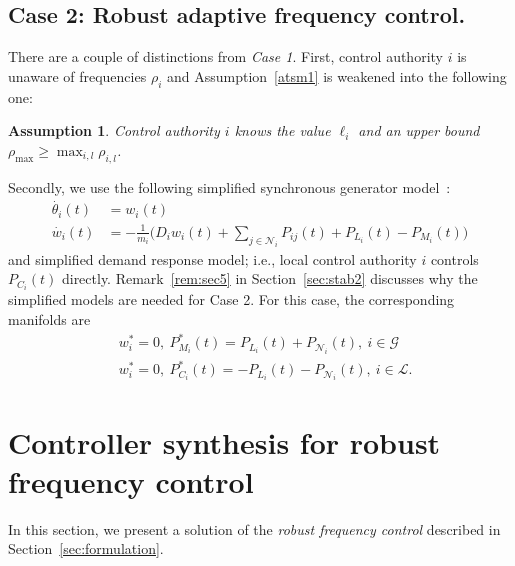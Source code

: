 \documentclass[journal]{IEEEtran}
\newcommand{\nnum}{\nonumber}
\newcommand{\GG}{{\mathcal{G}}}
\newcommand{\LL}{{\mathcal{L}}}
\newcommand{\NN}{{\mathcal{N}}}
\newtheorem{assumption}{\bf Assumption}[section]
\begin{document}
\subsection{Case 2: Robust adaptive frequency control.}\label{sec:formulation2}
There are a couple of distinctions from \emph{Case 1}.
First, control authority $i$ is unaware of frequencies $\rho_i$ and Assumption~\ref{atsm1} is weakened into the following one:
\begin{assumption}
Control authority $i$ knows the value $\ell_i$ and an upper bound $\rho_{\max} \geq \max_{i,l}\rho_{i,l}$.
\label{atsm3}
\end{assumption}
Secondly, we use the following simplified synchronous generator model~\cite{Wood:1996}:
\begin{align}
\dot{\theta_i}(t) &= w_i(t)\nnum\\
\dot{w_i}(t) &= -\frac{1}{m_i}\big(D_i w_i(t) + \sum_{j\in{{\NN}}_i} P_{ij}(t) + P_{L_i}(t)- P_{M_i}(t) \big)
\label{e24_2}
\end{align}
and simplified demand response model; i.e., local control authority $i$ controls $P_{C_i}(t)$ directly.
Remark~\ref{rem:sec5} in Section~\ref{sec:stab2} discusses why the simplified models are needed for Case 2.
For this case, the corresponding manifolds are
\begin{align}
&w_i^* = 0, \ P_{M_i}^*(t) = P_{L_i}(t)+P_{\NN_i}(t), \ i\in \GG\nnum\\
&w_i^* = 0, \ P_{C_i}^*(t) = -P_{L_i}(t)-P_{\NN_i}(t), \ i\in \LL.
\label{e19.03L}
\end{align}

\section{Controller synthesis for robust frequency control}\label{sec:sol1}
In this section, we present a solution of the \emph{robust frequency control} described in Section~\ref{sec:formulation}.
\end{document}

